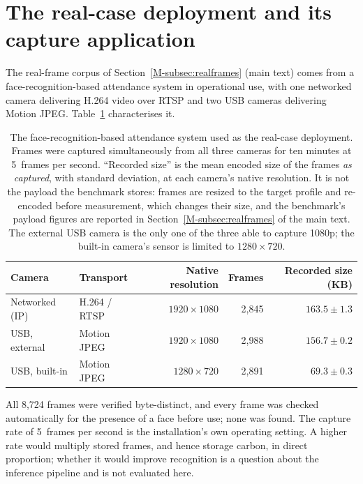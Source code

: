 \documentclass[11pt]{article}
\begin{document}
\section{The real-case deployment and its capture application}\label{sec:esm-deployment}
The real-frame corpus of Section~\ref{M-subsec:realframes} (main text) comes from a face-recognition-based attendance system in operational use, with one networked camera delivering H.264 video over RTSP and two USB cameras delivering Motion JPEG. Table~\ref{tab:esm-deployment} characterises it.

\begin{table}[htbp]
\centering
\caption{The face-recognition-based attendance system used as the real-case deployment. Frames were captured simultaneously from all three cameras for ten minutes at 5~frames per second. ``Recorded size'' is the mean encoded size of the frames \emph{as captured}, with standard deviation, at each camera's native resolution. It is not the payload the benchmark stores: frames are resized to the target profile and re-encoded before measurement, which changes their size, and the benchmark's payload figures are reported in Section~\ref{M-subsec:realframes} of the main text. The external USB camera is the only one of the three able to capture 1080p; the built-in camera's sensor is limited to $1280\times720$.}\label{tab:esm-deployment}
\small
\begin{tabular}{@{}llrrr@{}}
\toprule
Camera & Transport & Native resolution & Frames & Recorded size (KB) \\
\midrule
Networked (IP) & H.264 / RTSP & $1920\times1080$ & 2{,}845 & $163.5\pm1.3$ \\
USB, external  & Motion JPEG  & $1920\times1080$ & 2{,}988 & $156.7\pm0.2$ \\
USB, built-in  & Motion JPEG  & $1280\times720$  & 2{,}891 & $\phantom{0}69.3\pm0.3$ \\
\bottomrule
\end{tabular}

\smallskip
\parbox{0.9\linewidth}{\footnotesize All 8{,}724 frames were verified byte-distinct, and every frame was checked automatically for the presence of a face before use; none was found. The capture rate of 5~frames per second is the installation's own operating setting. A higher rate would multiply stored frames, and hence storage carbon, in direct proportion; whether it would improve recognition is a question about the inference pipeline and is not evaluated here.}
\end{table}
\end{document}
